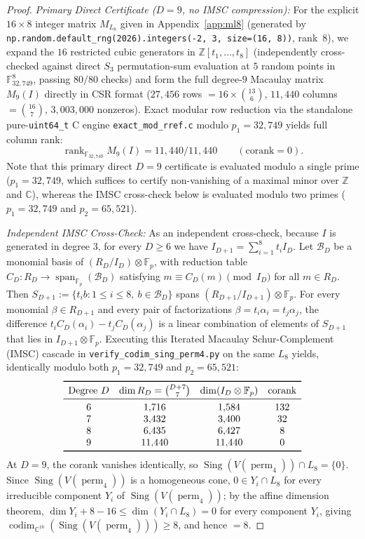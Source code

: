 \documentclass[11pt,a4paper]{article}
\theoremstyle{definition}
\DeclareMathOperator{\perm}{perm}
\DeclareMathOperator{\codim}{codim}
\DeclareMathOperator{\Sing}{Sing}
\DeclareMathOperator{\rank}{rank}
\DeclareMathOperator{\Span}{span}
\begin{document}
\begin{proof}
\emph{Primary Direct Certificate ($D = 9$, no IMSC compression):} For the explicit $16 \times 8$ integer matrix $M_{L_8}$ given in Appendix~\ref{app:ml8} (generated by \texttt{np.random.default\_rng(2026).integers(-2, 3, size=(16, 8))}, rank~$8$), we expand the $16$ restricted cubic generators in $\mathbb{Z}[t_1,\dots,t_8]$ (independently cross-checked against direct $S_3$ permutation-sum evaluation at $5$ random points in $\mathbb{F}_{32{,}749}^8$, passing $80/80$ checks) and form the full degree-$9$ Macaulay matrix $M_9(I)$ directly in CSR format ($27{,}456$ rows $= 16 \times \binom{13}{6}$, $11{,}440$ columns $= \binom{16}{7}$, $3{,}003{,}000$ nonzeros). Exact modular row reduction via the standalone pure-\texttt{uint64\_t} C engine \texttt{exact\_mod\_rref.c} modulo $p_1 = 32{,}749$ yields full column rank:
\[
  \rank_{\mathbb{F}_{32{,}749}} M_9(I) = 11{,}440 / 11{,}440 \qquad (\text{corank} = 0).
\]
Note that this primary direct $D = 9$ certificate is evaluated modulo a single prime ($p_1 = 32{,}749$, which suffices to certify non-vanishing of a maximal minor over $\mathbb{Z}$ and $\mathbb{C}$), whereas the IMSC cross-check below is evaluated modulo two primes ($p_1 = 32{,}749$ and $p_2 = 65{,}521$).

\emph{Independent IMSC Cross-Check:} As an independent cross-check, because $I$ is generated in degree $3$, for every $D \ge 6$ we have $I_{D+1} = \sum_{i=1}^8 t_i I_D$. Let $\mathcal{B}_D$ be a monomial basis of $(R_D / I_D) \otimes \mathbb{F}_p$, with reduction table $C_D : R_D \to \Span_{\mathbb{F}_p}(\mathcal{B}_D)$ satisfying $m \equiv C_D(m) \pmod{I_D}$ for all $m \in R_D$. Then $S_{D+1} := \{t_i b : 1 \le i \le 8,\ b \in \mathcal{B}_D\}$ spans $(R_{D+1}/I_{D+1}) \otimes \mathbb{F}_p$. For every monomial $\beta \in R_{D+1}$ and every pair of factorizations $\beta = t_i \alpha_i = t_j \alpha_j$, the difference $t_i C_D(\alpha_i) - t_j C_D(\alpha_j)$ is a linear combination of elements of $S_{D+1}$ that lies in $I_{D+1} \otimes \mathbb{F}_p$. Executing this Iterated Macaulay Schur-Complement (IMSC) cascade in \texttt{verify\_codim\_sing\_perm4.py} on the same $L_8$ yields, identically modulo both $p_1 = 32{,}749$ and $p_2 = 65{,}521$:
\[
\begin{array}{cccc}
\toprule
\text{Degree } D & \dim R_D = \binom{D+7}{7} & \dim(I_D \otimes \mathbb{F}_p) & \text{corank} \\
\midrule
6 & 1{,}716 & 1{,}584 & 132 \\
7 & 3{,}432 & 3{,}400 & 32 \\
8 & 6{,}435 & 6{,}427 & 8 \\
9 & 11{,}440 & 11{,}440 & 0 \\
\bottomrule
\end{array}
\]
At $D = 9$, the corank vanishes identically, so $\Sing(V(\perm_4)) \cap L_8 = \{0\}$. Since $\Sing(V(\perm_4))$ is a homogeneous cone, $0 \in Y_i \cap L_8$ for every irreducible component $Y_i$ of $\Sing(V(\perm_4))$; by the affine dimension theorem, $\dim Y_i + 8 - 16 \le \dim(Y_i \cap L_8) = 0$ for every component $Y_i$, giving $\codim_{\mathbb{C}^{16}}(\Sing(V(\perm_4))) \ge 8$, and hence $= 8$.


\end{proof}
\end{document}
